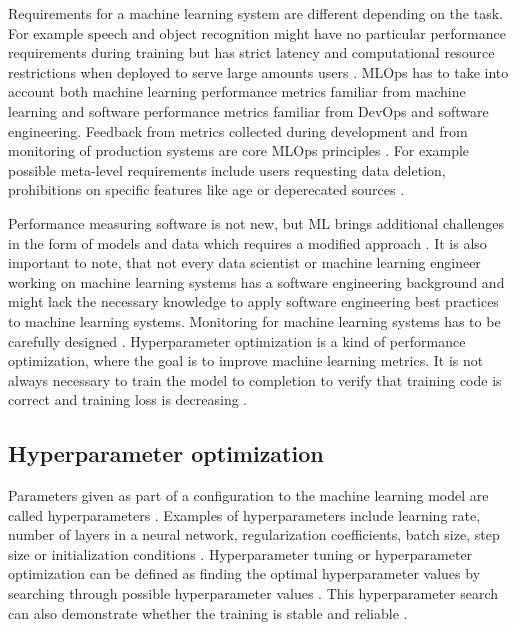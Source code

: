 Requirements for a machine learning system are different depending on the task. For example speech and object recognition might have no particular performance requirements during training but has strict latency and computational resource restrictions when deployed to serve large amounts users \parencite{hintonDistillingKnowledgeNeural2015}. MLOps has to take into account both machine learning performance metrics familiar from machine learning and software performance metrics familiar from DevOps and software engineering. Feedback from metrics collected during development and from monitoring of production systems are core MLOps principles \parencite{kreuzbergerMachineLearningOperations2023}. For example possible meta-level requirements include users requesting data deletion, prohibitions on specific features like age or deperecated sources \parencite{breckMLTestScore2017a}.

Performance measuring software is not new, but ML brings additional challenges in the form of models and data which requires a modified approach \parencite{breckMLTestScore2017a}. It is also important to note, that not every data scientist or machine learning engineer working on machine learning systems has a software engineering background \parencite{finzerDataScienceEducation2013} and might lack the necessary knowledge to apply software engineering best practices to machine learning systems. Monitoring for machine learning systems has to be carefully designed \parencite{sculleyHiddenTechnicalDebt2015a}. Hyperparameter optimization is a kind of performance optimization, where the goal is to improve machine learning metrics. It is not always necessary to train the model to completion to verify that training code is correct and training loss is decreasing \parencite{breckMLTestScore2017a}.


\subsection{Hyperparameter optimization}


Parameters given as part of a configuration to the machine learning model are called hyperparameters \parencite{yangHyperparameterOptimizationMachine2020}. Examples of hyperparameters include learning rate, number of layers in a neural network, regularization coefficients, batch size, step size or initialization conditions \parencite{maclaurinGradientbasedHyperparameterOptimization2015,bakerAcceleratingNeuralArchitecture2017,breckMLTestScore2017a}. Hyperparameter tuning or hyperparameter optimization can be defined as finding the optimal hyperparameter values by searching through possible hyperparameter values \parencite{bakerAcceleratingNeuralArchitecture2017}. This hyperparameter search can also demonstrate whether the training is stable and reliable \parencite{breckMLTestScore2017a}.

